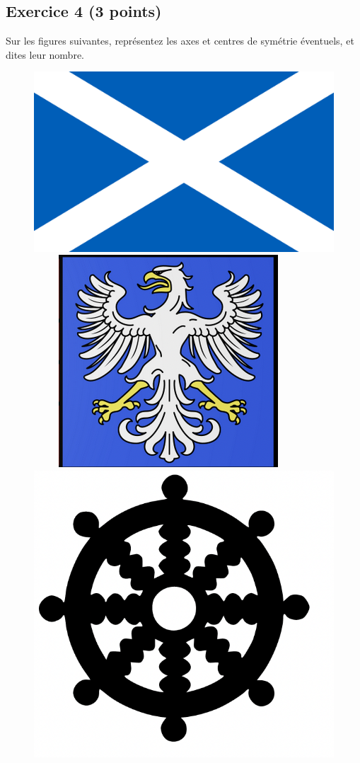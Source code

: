 \documentclass[14 pt]{extarticle}
\theoremstyle{plain}
\begin{document}
\subsection*{Exercice 4 (3 points)} 

Sur les figures suivantes, représentez les axes et centres de symétrie éventuels, et dites leur nombre.  

\begin{figure}[H]
\center 
\includegraphics[scale=.06]{ecosse.png}\ \ \ \ \ 
\includegraphics[scale=.6]{Blason2.png}\ \ \ \ \ 
\includegraphics[scale=.4]{Symb2.png}
\end{figure}
 
\end{document}
